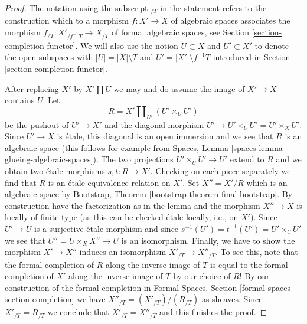 \documentclass[10pt,a4paper]{amsart}
\theoremstyle{plain}
\theoremstyle{definition}
\theoremstyle{remark}
\numberwithin{equation}{subsection}
\begin{document}
\begin{proof}
The notation using the subscript ${}_{/T}$ in the statement refers to the
construction which to a morphism $f : X' \to X$ of algebraic spaces
associates the morphism $f_{/T} : X'_{/f^{-1}T} \to X_{/T}$ of formal
algebraic spaces, see Section \ref{section-completion-functor}.
We will also use the notion $U \subset X$ and $U' \subset X'$ to denote
the open subspaces with $|U| = |X| \setminus T$ and
$U' = |X'| \setminus f^{-1}T$ introduced in
Section \ref{section-completion-functor}.

\medskip\noindent
After replacing $X'$ by $X' \amalg U$ we may and do assume
the image of $X' \to X$ contains $U$.
Let
$$
R = X' \amalg_{U'} (U' \times_U U')
$$
be the pushout of $U' \to X'$ and the diagonal morphism
$U' \to U' \times_U U' = U' \times_X U'$. Since $U' \to X$ is \'etale,
this diagonal is an open immersion and we see that $R$ is an algebraic space
(this follows for example from
Spaces, Lemma \ref{spaces-lemma-glueing-algebraic-spaces}).
The two projections $U' \times_U U' \to U'$ extend to $R$
and we obtain two \'etale morphisms $s, t : R \to X'$.
Checking on each piece separately we find that $R$
is an \'etale equivalence relation on $X'$. Set $X'' = X'/R$
which is an algebraic space by
Bootstrap, Theorem \ref{bootstrap-theorem-final-bootstrap}.
By construction have the factorization as in the lemma and
the morphism $X'' \to X$ is locally of finite type (as this
can be checked \'etale locally, i.e., on $X'$).
Since $U' \to U$ is a surjective \'etale morphism
and since $s^{-1}(U') = t^{-1}(U') = U' \times_U U'$
we see that $U'' = U \times_X X'' \to U$ is an isomorphism.
Finally, we have to show the morphism $X' \to X''$ induces an isomorphism
$X'_{/T} \to X''_{/T}$. To see this, note that the formal completion of $R$
along the inverse image of $T$ is equal to the formal completion of
$X'$ along the inverse image of $T$ by our choice of $R$! By
our construction of the formal completion in
Formal Spaces, Section \ref{formal-spaces-section-completion}
we have $X''_{/T} = (X'_{/T}) / (R_{/T})$ as sheaves. Since
$X'_{/T} = R_{/T}$ we conclude that $X'_{/T} = X''_{/T}$
and this finishes the proof.
\end{proof}
\end{document}
